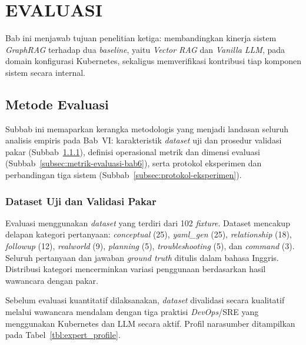 \cleardoublepage
\chapter{EVALUASI}
\label{chap:evaluasi}

Bab ini menjawab tujuan penelitian ketiga: membandingkan kinerja sistem \textit{GraphRAG} terhadap dua \textit{baseline}, yaitu \textit{Vector RAG} dan \textit{Vanilla LLM}, pada domain konfigurasi Kubernetes, sekaligus memverifikasi kontribusi tiap komponen sistem secara internal.

\section{Metode Evaluasi}

Subbab ini memaparkan kerangka metodologis yang menjadi landasan seluruh analisis empiris pada Bab~VI: karakteristik \textit{dataset} uji dan prosedur validasi pakar (Subbab~\ref{sec:expert_validation}), definisi operasional metrik dan dimensi evaluasi (Subbab~\ref{subsec:metrik-evaluasi-bab6}), serta protokol eksperimen dan perbandingan tiga sistem (Subbab~\ref{subsec:protokol-eksperimen}).

\subsection{Dataset Uji dan Validasi Pakar}
\label{sec:expert_validation}

Evaluasi menggunakan \textit{dataset} yang terdiri dari 102 \textit{fixture}. Dataset mencakup delapan kategori pertanyaan: \textit{conceptual} (25), \textit{yaml\_gen} (25), \textit{relationship} (18), \textit{followup} (12), \textit{realworld} (9), \textit{planning} (5), \textit{troubleshooting} (5), dan \textit{command} (3). Seluruh pertanyaan dan jawaban \textit{ground truth} ditulis dalam bahasa Inggris. Distribusi kategori mencerminkan variasi penggunaan berdasarkan hasil wawancara dengan pakar.

Sebelum evaluasi kuantitatif dilaksanakan, \textit{dataset} divalidasi secara kualitatif melalui wawancara mendalam dengan tiga praktisi \textit{DevOps}/SRE yang menggunakan Kubernetes dan LLM secara aktif. Profil narasumber ditampilkan pada Tabel~\ref{tbl:expert_profile}.

